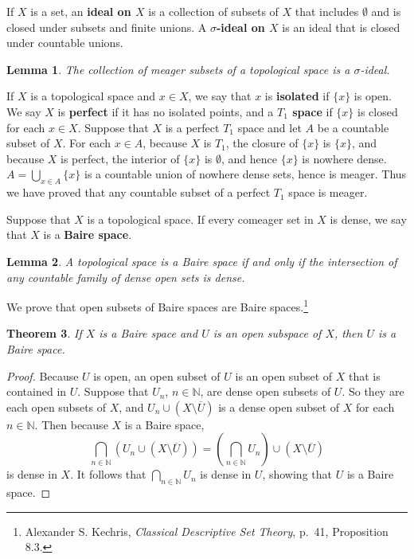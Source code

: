 \documentclass{article}
\newtheorem{theorem}{Theorem}
\newtheorem{lemma}[theorem]{Lemma}
\theoremstyle{definition}
\begin{document}
If $X$ is a set, an \textbf{ideal on $X$} is a collection of subsets of $X$ that includes $\emptyset$ and is closed under subsets and finite unions. A
\textbf{$\sigma$-ideal on $X$} is an ideal that is closed under countable unions.

\begin{lemma}
The collection of meager subsets of a topological space is a $\sigma$-ideal.
\end{lemma}


If $X$ is a topological space and $x \in X$, we say that $x$ is \textbf{isolated} if $\{x\}$ is open. We say $X$ is \textbf{perfect}
if it has no isolated points, and a \textbf{$T_1$ space} if $\{x\}$ is closed for each $x \in X$. Suppose that $X$ is a perfect $T_1$ space and let $A$ be a countable subset of $X$. 
For each $x \in A$, because $X$ is $T_1$, the closure of $\{x\}$ is $\{x\}$, and because $X$ is perfect, the interior of $\{x\}$ is $\emptyset$, and hence
$\{x\}$ is nowhere dense. $A=\bigcup_{x \in A} \{x\}$ is a countable union of nowhere dense sets, hence is meager. Thus we have proved
that any countable subset of a perfect $T_1$ space is meager.   

Suppose that $X$ is a topological space. If every comeager set in $X$ is dense, we say that $X$ is a \textbf{Baire space}. 

\begin{lemma}
A topological space is a Baire space if and only if the intersection of any countable family of  dense open sets is dense.
\end{lemma}

We prove that open subsets of Baire spaces are Baire spaces.\footnote{Alexander S. Kechris, {\em Classical Descriptive Set Theory}, p.~41, Proposition
8.3.}

\begin{theorem}
If $X$ is a Baire space and $U$ is an open subspace of $X$, then $U$ is a Baire space.
\end{theorem}
\begin{proof}
Because $U$ is open, an open subset of $U$ is an open subset of $X$ that is contained in $U$. 
Suppose that $U_n$, $n \in \mathbb{N}$, are dense open subsets of $U$. So they are each open subsets of $X$, 
and $U_n \cup (X \setminus \overline{U})$ is a dense open subset of $X$ for each $n \in \mathbb{N}$. 
Then because $X$ is a Baire space, 
\[
\bigcap_{n \in \mathbb{N}} (U_n \cup (X \setminus \overline{U})) = \left( \bigcap_{n \in \mathbb{N}} U_n \right) \cup (X \setminus \overline{U})
\]
is dense in $X$. It follows that $\bigcap_{n \in \mathbb{N}} U_n$ is dense in $U$, showing that $U$ is a Baire space.
\end{proof} 
\end{document}
